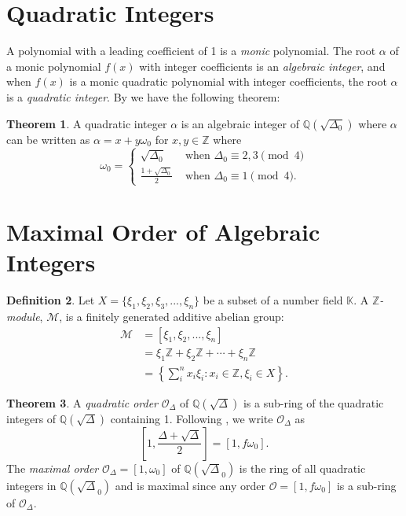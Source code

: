 \documentclass{ucalgthes1}
\theoremstyle{definition}
\newtheorem{thm}{Theorem}[section]
\newtheorem{defn}[thm]{Definition}
\newcommand{\KK}{\mathbb{K}}
\newcommand{\MM}{\mathcal{M}}
\newcommand{\OO}{\mathcal{O}}
\newcommand{\ZZ}{\mathbb{Z}}
\newcommand{\QQ}{\mathbb{Q}}
\begin{document}
\bigbreak
\section{Quadratic Integers}

A polynomial with a leading coefficient of 1 is a \emph{monic} polynomial. The root $\alpha$ of a monic polynomial $f(x)$ with integer coefficients is an \emph{algebraic integer}, and when $f(x)$ is a monic quadratic polynomial with integer coefficients, the root $\alpha$ is a \emph{quadratic integer}. By \cite[p.77]{Jacobson2009} we have the following theorem:

\begin{thm}
A quadratic integer $\alpha$ is an algebraic integer of $\QQ(\sqrt{\Delta_0})$ where $\alpha$ can be written as $\alpha = x + y \omega_0$ for $x, y \in \ZZ$ where
\begin{equation*}
	\omega_0 = \begin{cases}
		\sqrt{\Delta_0} & \textrm{ when } \Delta_0 \equiv 2, 3 \pmod 4 \\
		\frac{1+\sqrt{\Delta_0}}{2} & \textrm{ when } \Delta_0 \equiv 1 \pmod 4.
	\end{cases}
\end{equation*}
\end{thm}


\bigbreak
\section{Maximal Order of Algebraic Integers}

\begin{defn}
Let $X = \{ \xi_1, \xi_2, \xi_3, ..., \xi_n \}$ be a subset of a number field $\KK$.  A \emph{$\ZZ$\mbox{-}module}, $\MM$, is a finitely generated additive abelian group:
\begin{align*}
	\MM &= [ \xi_1, \xi_2, ..., \xi_n ] \\
	& =  \xi_1 \ZZ + \xi_2 \ZZ + \cdots + \xi_n \ZZ \\
	& = \left \{ \sum_{i}^n x_i \xi_i : x_i \in \ZZ, \xi_i \in X \right \}.
\end{align*}
\end{defn}

\begin{thm}
A \emph{quadratic order} $\OO_\Delta$ of $\QQ(\sqrt\Delta)$ is a sub-ring of the quadratic integers of $\QQ(\sqrt\Delta)$ containing 1.  Following \cite[p.81]{Jacobson2009}, we write $\OO_\Delta$ as
\[
	\left[ 1, \frac{\Delta + \sqrt{\Delta}}{2} \right] = [1, f\omega_0].
\]
The \emph{maximal order} $\OO_\Delta = [1, \omega_0]$ of $\QQ(\sqrt\Delta_0)$ is the ring of all quadratic integers in $\QQ(\sqrt\Delta_0)$ and is maximal since any order $\OO = [1, f\omega_0]$ is a sub-ring of $\OO_\Delta$. 
\end{thm}
\end{document}
